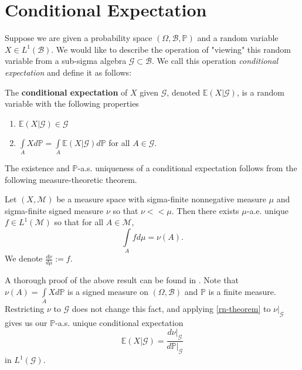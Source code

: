 \section{Conditional Expectation}
\label{stoch:cexpe}

Suppose we are given a probability space \((\Omega, \mathcal{B}, \mathbb{P})\) and a random variable \(X \in L^{1}(\mathcal{B})\). We would like to describe the operation of "viewing" this random variable from a sub-sigma algebra \(\mathcal{G} \subset \mathcal{B}\). We call this operation \textit{conditional expectation} and define it as follows:

\begin{definition}
   The \textbf{conditional expectation} of \(X\) given \(\mathcal{G}\), denoted \(\mathbb{E}({X}|{\mathcal{G}})\), is a random variable with the following properties
    \begin{enumerate}
        \item \(\mathbb{E}({X}|{\mathcal{G}}) \in \mathcal{G}\)
        \item \(\int\limits_{A} X d \mathbb{P} = \int\limits_{A} \mathbb{E}({X}|{\mathcal{G}}) d \mathbb{P}\) for all \(A \in \mathcal{G}\).
    \end{enumerate}
\end{definition}

The existence and \(\mathbb{P}\)-a.s. uniqueness of a conditional expectation follows from the following measure-theoretic theorem.

\begin{theorem}
    \label{rn-theorem}
    Let \((X, \mathcal{M})\) be a measure space with sigma-finite nonnegative measure \(\mu\) and sigma-finite signed measure \(\nu\) so that \(\nu << \mu\). Then there exists \(\mu\)-a.e. unique \(f \in L^{1}(\mathcal{M})\) so that for all \(A \in \mathcal{M}\),
    \[\int\limits_{A}f d \mu = \nu(A).\]
    We denote \(\frac{d \nu}{d \mu} := f\).
\end{theorem}

A thorough proof of the above result can be found in \cite{folland_2011}. Note that \(\nu(A) = \int\limits_{A} X d \mathbb{P}\) is a signed measure on \((\Omega, \mathcal{B})\) and \(\mathbb{P}\) is a finite measure. Restricting \(\nu\) to \(\mathcal{G}\) does not change this fact, and applying \ref{rn-theorem} to \(\nu{\big|}_{\mathcal{G}}\) gives us our \(\mathbb{P}\)-a.s. unique conditional expectation
\[\mathbb{E}({X}|{\mathcal{G}}) = \frac{d \nu{\big|}_{\mathcal{G}}}{d \mathbb{P}{\big|}_{\mathcal{G}}} \]
in \(L^{1}(\mathcal{G})\).

